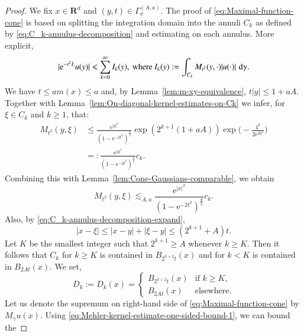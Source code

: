 \documentclass[preprint,12pt]{elsarticle}
\theoremstyle{remark}
\newcommand{\D}{\,\textup{d}}
\renewcommand{\leq}{\leqslant}
\renewcommand{\geq}{\geqslant}
\newcommand{\R}{\mathbf R}
\newcommand{\e}{\mathrm{e}} %
\begin{document}
\begin{proof}
  We fix $x \in \R^d$ and $ (y, t) \in \Gamma_x^{(A, a)}$. The proof of
  \eqref{eq:Maximal-function-cone} is based on splitting the
  integration domain into the annuli $C_k$ as defined by
  \eqref{eq:C_k-annulus-decomposition} and estimating on each annulus. More
  explicit,
  \begin{equation}
    \label{eq:Maximal-function-cone-intermediate-step-1}
    |\e^{-t^2 L} u(y)| \leq \sum_{k = 0}^\infty I_k(y),
    \:\text{where}\: I_k(y) := \int_{C_k} M_{t^2}(y, \cdot) |u(\cdot)|
    \,\D\gamma.
  \end{equation} 
  We have $t \leq a m(x) \leq a$ and, by Lemma~\ref{lem:m-xy-equivalence}, $t
  |y| \leq 1 + aA$. Together with
  Lemma~\ref{lem:On-diagonal-kernel-estimates-on-Ck} we infer, for $\xi \in
  C_k$ and $k \geq 1$, that:
  \begin{align*}
    \label{eq:Mehler-kernel-estimate-one-sided-bound-1}
    M_{t^2}(y, \xi) &\leq \frac{\e^{|y|^2}}{(1 - \e^{-2t^2})^{\frac{d}2}}
    \exp(2^{k + 1} (1 + aA)) \exp\Big(-\frac{4^k}{2 \e^{2 a^2}} \Bigr)\\
    &=: \frac{\e^{|y|^2}}{(1 - \e^{-2t^2})^{\frac{d}2}} c_k.
  \end{align*}
  Combining this with Lemma~\ref{lem:Cone-Gaussians-comparable}, we obtain
  \begin{equation}
    \label{eq:Mehler-kernel-estimate-one-sided-bound-1}
    M_{t^2}(y, \xi) \lesssim_{A, a} \frac{\e^{|x|^2}}{(1 - \e^{-2t^2})^{\frac{d}2}} c_k.
  \end{equation}       
  Also, by \eqref{eq:C_k-annulus-decomposition-expand},
  \begin{equation*}
    |x - \xi| \leq |x - y| + |\xi - y| \leq (2^{k + 1} + A) t .
  \end{equation*}
  Let $K$ be the smallest integer such that $2^{k + 1} \geq A$ whenever $k \geq
  K$. Then it follows that $C_k$ for $k \geq K$ is contained in $B_{2^{k +
      2}t}(x)$ and for $k < K$ is contained in $B_{2At}(x)$. We set,
  \begin{equation*}
    D_k := D_k(x) =
    \begin{cases}
      B_{2^{k + 2}t}(x) &\text{if $k \geq K$,}\\
      B_{2At}(x) &\text{elsewhere.}
    \end{cases}
  \end{equation*}
  Let us denote the supremum on right-hand side of
  \eqref{eq:Maximal-function-cone} by $M_\gamma u (x)$. Using
  \eqref{eq:Mehler-kernel-estimate-one-sided-bound-1}, we can bound the

\end{proof}
\end{document}
